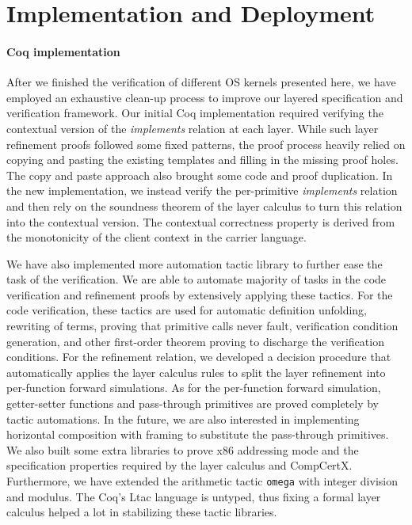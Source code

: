 
\section{Implementation and Deployment}
\label{sec:impl}

\paragraph{Coq implementation}

After we finished the verification of different OS kernels presented
here, we have employed an exhaustive clean-up process to improve our
layered specification and verification framework.  Our initial Coq
implementation required verifying the contextual version of the
{\em implements} relation at each layer.  While such layer refinement
proofs followed some fixed patterns, the proof process heavily relied
on copying and pasting the existing templates and filling in the
missing proof holes.  The copy and paste approach also brought some
code and proof duplication.  In the new implementation, we instead
verify the per-primitive {\em implements} relation and then rely on the
soundness theorem of the layer calculus to turn this relation into the
contextual version. The contextual correctness property is derived
from the monotonicity of the client context in the carrier language.

We have also implemented more automation tactic library to further
ease the task of the verification. We are able to automate majority of
tasks in the code verification and refinement proofs by extensively
applying these tactics. For the code verification, these tactics are
used for automatic definition unfolding, rewriting of terms, proving
that primitive calls never fault, verification condition generation,
and other first-order theorem proving to discharge the verification
conditions.  For the refinement relation, we developed a decision
procedure that automatically applies the layer calculus rules to split
the layer refinement into per-function forward simulations.  As for
the per-function forward simulation, getter-setter functions and
pass-through primitives are proved completely by tactic automations.
In the future, we are also interested in implementing horizontal
composition with framing to substitute the pass-through primitives.
We also built some extra libraries to prove x86 addressing mode and
the specification properties required by the layer calculus and
CompCertX.  Furthermore, we have extended the arithmetic
tactic \texttt{omega} with integer division and modulus.  The Coq's
Ltac language is untyped, thus fixing a formal layer calculus helped a
lot in stabilizing these tactic libraries.

